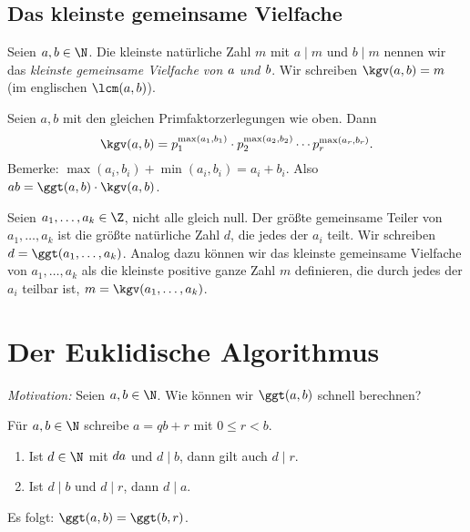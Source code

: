 \subsection*{Das kleinste gemeinsame Vielfache}

\begin{defn*}
	Seien $a,b \in \N$. Die kleinste natürliche Zahl $m$ mit $a \mid m$ und $b \mid m$ nennen wir das \emph{kleinste gemeinsame Vielfache von $\emph{a}$ und $\emph{b}$}. Wir schreiben $\kgv(a,b) = m$ (im englischen $\lcm(a,b)$).
\end{defn*}

\begin{rem*}
	Seien $a,b$ mit den gleichen Primfaktorzerlegungen wie oben. Dann
	\[ \kgv(a,b) = p_1^{\max(a_1,b_1)} \cdot p_2^{\max(a_2,b_2)} \dotsm p_r^{\max(a_r,b_r)}. \]
	Bemerke: $\max(a_i,b_i) + \min(a_i,b_i) = a_i + b_i$. Also $ab = \ggt(a,b) \cdot \kgv(a,b)$.
\end{rem*}

\begin{defn*}
	Seien \( a_1,\dotsc,a_k \in \Z \), nicht alle gleich null. Der größte gemeinsame Teiler von \( a_1,\dotsc,a_k \) ist die größte natürliche Zahl $d$, die jedes der $a_i$ teilt. Wir schreiben \( d = \ggt(a_1,\dotsc,a_k) \). Analog dazu können wir das kleinste gemeinsame Vielfache von $a_1,\dotsc, a_k$ als die kleinste positive ganze Zahl $m$ definieren, die durch jedes der $a_i$ teilbar ist, $m = \kgv(a_1,\dotsc,a_k)$.
\end{defn*}

\section*{Der Euklidische Algorithmus}

\emph{Motivation:} Seien $a,b \in \N$. Wie können wir $\ggt(a,b)$ schnell berechnen?

\begin{rem*}
	Für $a,b \in \N$ schreibe $a = qb + r$ mit $0 \leq r < b$.
	\begin{enumerate}[label={\roman*})]
		\item Ist $d \in \N$ mit $d \mit a$ und $d \mid b$, dann gilt auch $d \mid r$.
		\item Ist $d \mid b$ und $d \mid r$, dann $d \mid a$.
	\end{enumerate}
	Es folgt: $\ggt(a,b) = \ggt(b,r)$.
\end{rem*}

